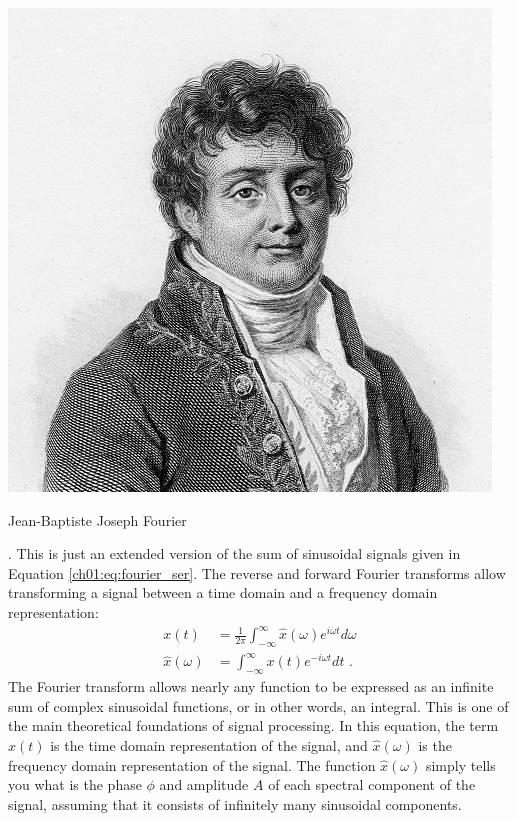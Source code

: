 \begin{marginfigure}
\begin{center}
  \includegraphics[width=\textwidth]{ch01/figures/fourier_head.jpg}
\end{center}
\caption{Jean-Baptiste Joseph Fourier}
\label{fig:joe_fourier}
\end{marginfigure}

. This is just an extended version of the sum of sinusoidal signals given in Equation \ref{ch01:eq:fourier_ser}. The
reverse and forward Fourier transforms allow transforming a signal
between a time domain and a frequency domain representation:
\begin{align}
x(t) &= \frac{1}{2\pi}\int_{-\infty}^{\infty} \hat{x}(\omega) e^{i\omega t} d\omega \\
\hat{x}(\omega) &= \int_{-\infty}^{\infty} x(t) e^{-i\omega t} dt \,\,.
\end{align}
The Fourier transform allows nearly any function to be expressed as an
infinite sum of complex sinusoidal functions, or in other words, an
integral. This is one of the main theoretical foundations of signal
processing. In this equation, the term $x(t)$ is the time domain
representation of the signal, and $\hat{x}(\omega)$ is the frequency
domain representation of the signal. The function $\hat{x}(\omega)$
simply tells you what is the phase $\phi$ and amplitude $A$ of
each spectral component of the signal, assuming that it consists of
infinitely many sinusoidal components.


